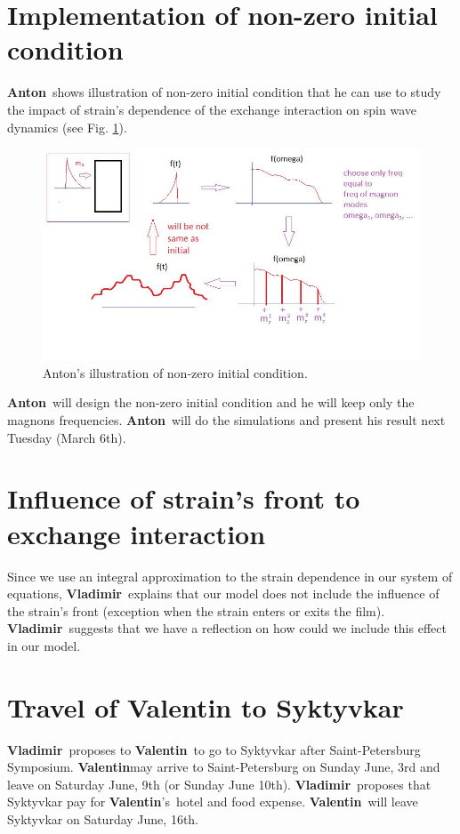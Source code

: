 \documentclass[12pt,a4paper]{article}
\newcommand{\valentin}{\textbf{Valentin}}
\newcommand{\vladimir}{\textbf{Vladimir}}
\newcommand{\anton}{\textbf{Anton}}
\begin{document}
\section{Implementation of non-zero initial condition}
\label{sec1}
\anton\ shows illustration of non-zero initial condition that he can use to study the impact of strain's dependence of the exchange interaction on spin wave dynamics (see Fig. \ref{fig:NonZeroIntialCondition}).
\begin{figure}
    \centering
    \includegraphics[width=\textwidth]{idea_exchange_from_initial_m_not_zero.png}
    \caption{Anton's illustration of non-zero initial condition.}
    \label{fig:NonZeroIntialCondition}
\end{figure}
\anton\ will design the non-zero initial condition and he will keep only the magnons frequencies.
\anton\ will do the simulations and present his result next Tuesday (March 6th).

\section{Influence of strain's front to exchange interaction}
\label{sec2}
Since we use an integral approximation to the strain dependence in our system of equations, \vladimir\ explains that our model does not include the influence of the strain's front (exception when the strain enters or exits the film).
\vladimir\ suggests that we have a reflection on how could we include this effect in our model.

\section{Travel of Valentin to Syktyvkar}
\label{sec3}
\vladimir\ proposes to \valentin\ to go to Syktyvkar after Saint-Petersburg Symposium.
\valentin may arrive to Saint-Petersburg on Sunday June, 3rd and leave on Saturday June, 9th (or Sunday June 10th).
\vladimir\ proposes that Syktyvkar pay for \valentin's\ hotel and food expense.
\valentin\ will leave Syktyvkar on Saturday June, 16th.
\end{document}
